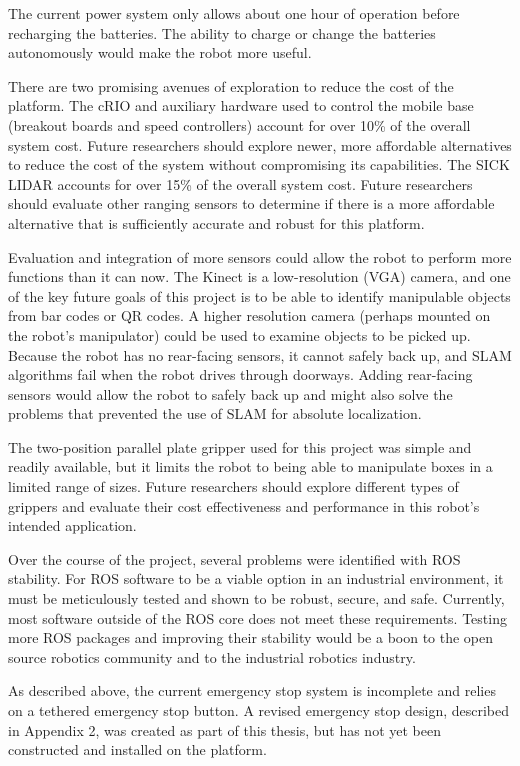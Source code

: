 \documentclass[]{cwru} %
\begin{document}
The current power system only allows about one hour of operation before
recharging the batteries. The ability to charge or change the batteries
autonomously would make the robot more useful.

There are two promising avenues of exploration to reduce the cost of the
platform. The cRIO and auxiliary hardware used to control the mobile
base (breakout boards and speed controllers) account for over 10\% of
the overall system cost. Future researchers should explore newer, more
affordable alternatives to reduce the cost of the system without
compromising its capabilities. The SICK LIDAR accounts for over 15\% of
the overall system cost. Future researchers should evaluate other
ranging sensors to determine if there is a more affordable alternative
that is sufficiently accurate and robust for this platform.

Evaluation and integration of more sensors could allow the robot to
perform more functions than it can now. The Kinect is a low-resolution
(VGA) camera, and one of the key future goals of this project is to be
able to identify manipulable objects from bar codes or QR codes. A
higher resolution camera (perhaps mounted on the robot's manipulator)
could be used to examine objects to be picked up. Because the robot has
no rear-facing sensors, it cannot safely back up, and SLAM algorithms
fail when the robot drives through doorways. Adding rear-facing sensors
would allow the robot to safely back up and might also solve the
problems that prevented the use of SLAM for absolute localization.

The two-position parallel plate gripper used for this project was simple
and readily available, but it limits the robot to being able to
manipulate boxes in a limited range of sizes. Future researchers should
explore different types of grippers and evaluate their cost
effectiveness and performance in this robot's intended application.

Over the course of the project, several problems were identified with
ROS stability. For ROS software to be a viable option in an industrial
environment, it must be meticulously tested and shown to be robust,
secure, and safe. Currently, most software outside of the ROS core does
not meet these requirements. Testing more ROS packages and improving
their stability would be a boon to the open source robotics community
and to the industrial robotics industry.

As described above, the current emergency stop system is incomplete and
relies on a tethered emergency stop button. A revised emergency stop
design, described in Appendix 2, was created as part of this thesis, but
has not yet been constructed and installed on the platform.
\end{document}
